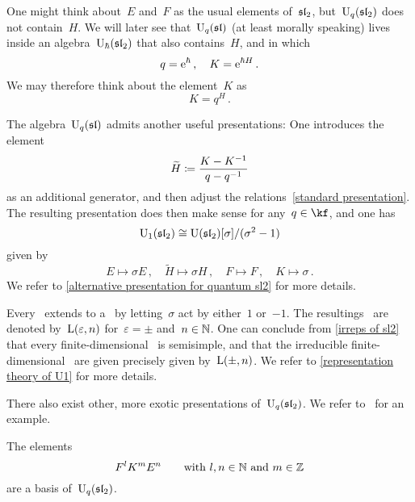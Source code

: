\documentclass[a4paper, 11pt, oneside]{scrartcl}
\begin{document}
\begin{remark}
  One might think about~$E$ and~$F$ as the usual elements of~$\mathfrak{sl}_2$, but~$\operatorname{U}_q(\mathfrak{sl}_2)$ does not contain~$H$.
  We will later see that~$\operatorname{U}_q(\mathfrak{sl})$ (at least morally speaking) lives inside an algebra~$\operatorname{U}_{\hbar}(\mathfrak{sl}_2)$ that also contains~$H$, and in which
  \[
    q = \mathrm{e}^{\hbar} \,,
    \quad
    K = \mathrm{e}^{\hbar H} \,.
  \]
  We may therefore think about the element~$K$ as
  \[
    K
    =
    q^H \,.
  \]
\end{remark}

\begin{remark}[The case~$q = 1$]
  \label{quantum U1}
  The algebra~$\operatorname{U}_q(\mathfrak{sl})$ admits another useful presentations:
  One introduces the element
  \[
    \widetilde{H}
    \coloneqq
    \frac{K - K^{-1}}{q - q^{-1}}
  \]
  as an additional generator, and then adjust the relations~\eqref{standard presentation}.
  The resulting presentation does then make sense for any~$q \in \kf$, and one has
  \[
    \operatorname{U}_1(\mathfrak{sl}_2)
    \cong
    \operatorname{U}(\mathfrak{sl}_2)[\sigma]/(\sigma^2 - 1)
  \]
  given by
  \[
    E \mapsto \sigma E \,,
    \quad
    \widetilde{H} \mapsto \sigma H \,,
    \quad
    F \mapsto F \,,
    \quad
    K \mapsto \sigma \,.
  \]
  We refer to \cref{alternative presentation for quantum sl2} for more details.

  Every~ extends to a~ by letting~$\sigma$ act by either~$1$ or~$-1$.
  The resultings~ are denoted by~$\operatorname{L}(\varepsilon, n)$ for~$\varepsilon = \pm$ and~$n \in \mathbb{N}$.
  One can conclude from \cref{irreps of sl2} that every finite-dimensional~ is semisimple, and that the irreducible finite-dimensional~ are given precisely given by~$\operatorname{L}(\pm, n)$.
  We refer to \cref{representation theory of U1} for more details.
\end{remark}

\begin{remark}
  There also exist other, more exotic presentations of~$\operatorname{U}_q(\mathfrak{sl}_2)$.
  We refer to~\cite{equitable_presentation} for an example.
\end{remark}

\begin{theorem}[PBW]
  \label{quantum pbw}
  The elements
  \[
    F^l K^m E^n
    \qquad
    \text{with~$l, n \in \mathbb{N}$ and~$m \in \mathbb{Z}$} 
  \]
  are a basis of~$\operatorname{U}_q(\mathfrak{sl}_2)$.
\end{theorem}
\end{document}
